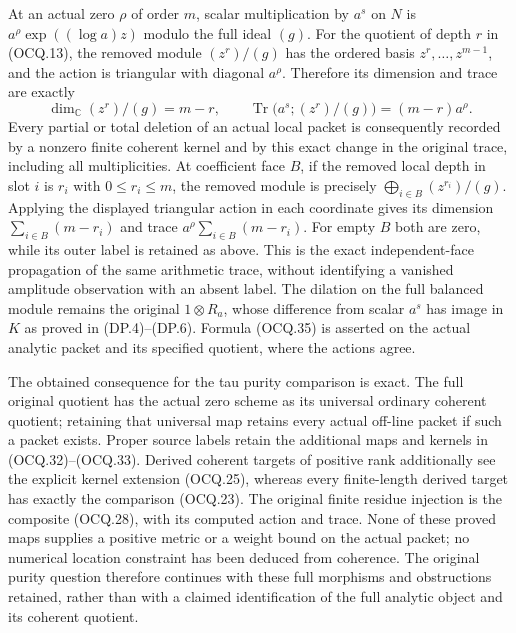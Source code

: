 At an actual zero $\rho$ of order $m$, scalar multiplication by
$a^s$ on $N$ is
$a^\rho\exp((\log a)z)$ modulo the full ideal $(g)$.
For the quotient of depth $r$ in (OCQ.13), the removed module
$(z^r)/(g)$ has the ordered basis
$z^r,\ldots,z^{m-1}$, and the action is triangular with diagonal
$a^\rho$.  Therefore its dimension and trace are exactly
\[
 \dim_{\mathbb C}(z^r)/(g)=m-r,
 \qquad\operatorname{Tr}\bigl(a^s;(z^r)/(g)\bigr)
                 =(m-r)a^\rho.                              \tag{OCQ.35}
\]
Every partial or total deletion of an actual local packet is consequently
recorded by a nonzero finite coherent kernel and by this exact change in
the original trace, including all multiplicities.
At coefficient face $B$, if the removed local depth in slot $i$ is
$r_i$ with $0\le r_i\le m$, the removed module is precisely
$\bigoplus_{i\in B}(z^{r_i})/(g)$. Applying the displayed
triangular action in each coordinate gives its dimension
$\sum_{i\in B}(m-r_i)$ and trace
$a^\rho\sum_{i\in B}(m-r_i)$. For empty $B$ both are zero,
while its outer label is retained as above. This is the exact
independent-face propagation of the same arithmetic trace, without
identifying a vanished amplitude observation with an absent label.
The dilation on the full balanced module remains the original
$1\otimes R_a$, whose difference from scalar $a^s$ has image in $K$
as proved in (DP.4)--(DP.6).  Formula (OCQ.35) is asserted on the actual
analytic packet and its specified quotient, where the actions agree.

The obtained consequence for the tau purity comparison is exact.
The full original quotient has the actual zero scheme as its universal
ordinary coherent quotient; retaining that universal map retains every
actual off-line packet if such a packet exists.  Proper source labels
retain the additional maps and kernels in (OCQ.32)--(OCQ.33).
Derived coherent targets of positive rank additionally see the explicit
kernel extension (OCQ.25), whereas every finite-length derived target
has exactly the comparison (OCQ.23).  The original finite residue
injection is the composite (OCQ.28), with its computed action and trace.
None of these proved maps supplies a positive metric or a weight bound
on the actual packet; no numerical location constraint has been deduced
from coherence.  The original purity question therefore continues with
these full morphisms and obstructions retained, rather than with a
claimed identification of the full analytic object and its coherent
quotient.
